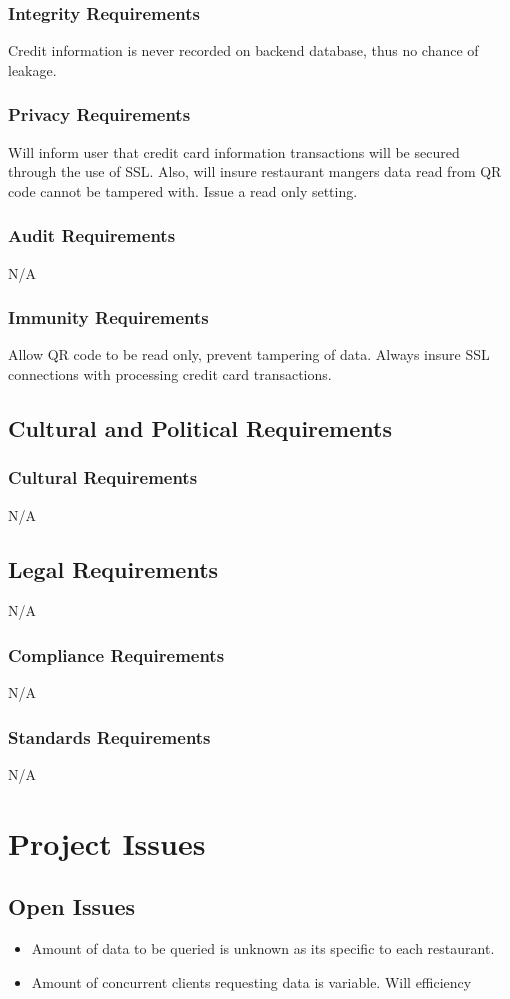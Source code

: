 \documentclass[12pt, titlepage]{article}
\begin{document}
\subsubsection{Integrity Requirements}
Credit information is never recorded on backend database, thus no chance of leakage.
\subsubsection{Privacy Requirements}
Will inform user that credit card information transactions will be secured through the use of SSL. Also, will insure restaurant mangers data read from QR code cannot be tampered with. Issue a read only setting. 
\subsubsection{Audit Requirements}
N/A
\subsubsection{Immunity Requirements}
Allow QR code to be read only, prevent tampering of data. 	Always insure SSL connections with processing credit card transactions.
\subsection{Cultural and Political Requirements}
\subsubsection{Cultural Requirements}
N/A
\subsection{Legal Requirements}
N/A
\subsubsection{Compliance Requirements}
N/A
\subsubsection{Standards Requirements}
N/A

\section{Project Issues}
\subsection{Open Issues}
\begin{itemize}
\item Amount of data to be queried is unknown as its specific to each restaurant.
\item Amount of concurrent clients requesting data is variable. Will efficiency
\end{itemize}
\end{document}

